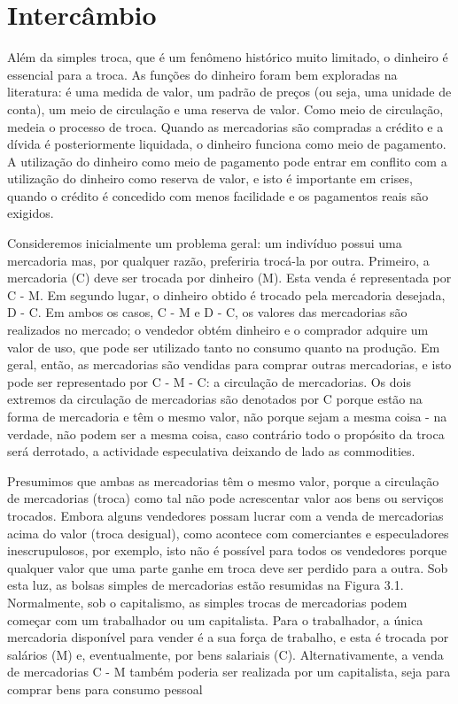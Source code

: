 \section{Intercâmbio}
 \par 
Além da simples troca, que é um fenômeno histórico muito limitado, o dinheiro é essencial para a troca. As funções do dinheiro foram bem exploradas na literatura: é uma medida de valor, um padrão de preços (ou seja, uma unidade de conta), um meio de circulação e uma reserva de valor. Como meio de circulação, medeia o processo de troca. Quando as mercadorias são compradas a crédito e a dívida é posteriormente liquidada, o dinheiro funciona como meio de pagamento. A utilização do dinheiro como meio de pagamento pode entrar em conflito com a utilização do dinheiro como reserva de valor, e isto é importante em crises, quando o crédito é concedido com menos facilidade e os pagamentos reais são exigidos.
 \par 
Consideremos inicialmente um problema geral: um indivíduo possui uma mercadoria mas, por qualquer razão, preferiria trocá-la por outra. Primeiro, a mercadoria (C) deve ser trocada por dinheiro (M). Esta venda é representada por C - M. Em segundo lugar, o dinheiro obtido é trocado pela mercadoria desejada, D - C. Em ambos os casos, C - M e D - C, os valores das mercadorias são realizados no mercado; o vendedor obtém dinheiro e o comprador adquire um valor de uso, que pode ser utilizado tanto no consumo quanto na produção. Em geral, então, as mercadorias são vendidas para comprar outras mercadorias, e isto pode ser representado por C - M - C: a circulação de mercadorias. Os dois extremos da circulação de mercadorias são denotados por C porque estão na forma de mercadoria e têm o mesmo valor, não porque sejam a mesma coisa - na verdade, não podem ser a mesma coisa, caso contrário todo o propósito da troca será derrotado, a actividade especulativa deixando de lado as commodities.
 \par 
Presumimos que ambas as mercadorias têm o mesmo valor, porque a circulação de mercadorias (troca) como tal não pode acrescentar valor aos bens ou serviços trocados. Embora alguns vendedores possam lucrar com a venda de mercadorias acima do valor (troca desigual), como acontece com comerciantes e especuladores inescrupulosos, por exemplo, isto não é possível para todos os vendedores porque qualquer valor que uma parte ganhe em troca deve ser perdido para a outra. Sob esta luz, as bolsas simples de mercadorias estão resumidas na Figura {\color{blue}3}.1. Normalmente, sob o capitalismo, as simples trocas de mercadorias podem começar com um trabalhador ou um capitalista. Para o trabalhador, a única mercadoria disponível para vender é a sua força de trabalho, e esta é trocada por salários (M) e, eventualmente, por bens salariais (C). Alternativamente, a venda de mercadorias C - M também poderia ser realizada por um capitalista, seja para comprar bens para consumo pessoal
 \par 
